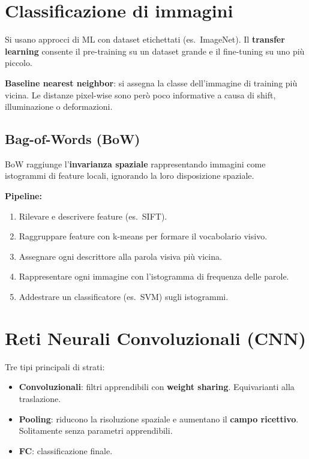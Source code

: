 \documentclass[12pt, a4paper]{report}
\begin{document}
\section{Classificazione di immagini}

Si usano approcci di ML con dataset etichettati (es.\ ImageNet). Il
\textbf{transfer learning} consente il pre-training su un dataset grande e il
fine-tuning su uno più piccolo.

\textbf{Baseline nearest neighbor}: si assegna la classe dell'immagine di training
più vicina. Le distanze pixel-wise sono però poco informative a causa di shift,
illuminazione o deformazioni.

\subsection{Bag-of-Words (BoW)}

BoW raggiunge l'\textbf{invarianza spaziale} rappresentando immagini come
istogrammi di feature locali, ignorando la loro disposizione spaziale.

\textbf{Pipeline:}
\begin{enumerate}
  \item Rilevare e descrivere feature (es.\ SIFT).
  \item Raggruppare feature con k-means per formare il vocabolario visivo.
  \item Assegnare ogni descrittore alla parola visiva più vicina.
  \item Rappresentare ogni immagine con l'istogramma di frequenza delle parole.
  \item Addestrare un classificatore (es.\ SVM) sugli istogrammi.
\end{enumerate}

\section{Reti Neurali Convoluzionali (CNN)}

Tre tipi principali di strati:
\begin{itemize}
  \item \textbf{Convoluzionali}: filtri apprendibili con \textbf{weight sharing}.
        Equivarianti alla traslazione.
  \item \textbf{Pooling}: riducono la risoluzione spaziale e aumentano il
        \textbf{campo ricettivo}. Solitamente senza parametri apprendibili.
  \item \textbf{FC}: classificazione finale.
\end{itemize}
\end{document}

